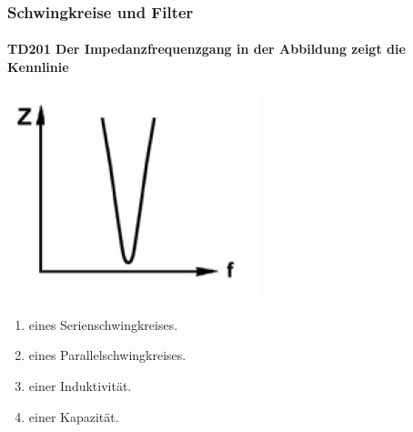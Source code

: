 \documentclass[8pt]{article}
\begin{document}
\begin{enumerate}
\begin{enumerate}[nolistsep,label=\Alph*]
{\pagebreak
\subsubsection{Schwingkreise und Filter}
\paragraph*{TD201 Der Impedanzfrequenzgang in der Abbildung zeigt die Kennlinie}
\begin{center}
	\begin{minipage}{\linewidth}
		\centering
		\includegraphics[scale=1.0]{pics/td201_a.jpg}
	\end{minipage}
\end{center}
\begin{enumerate}[nolistsep,label=\Alph*]
\item eines Serienschwingkreises.
\item eines Parallelschwingkreises.
\item einer Induktivität.
\item einer Kapazität.
\end{enumerate}

}
\end{enumerate}
\end{enumerate}
\end{document}
